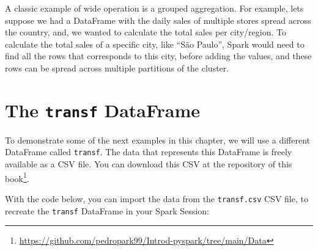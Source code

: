 \documentclass[
  11pt,
  letterpaper,
  DIV=11,
  numbers=noendperiod]{scrreprt}
\begin{document}
A classic example of wide operation is a grouped aggregation. For
example, lets suppose we had a DataFrame with the daily sales of
multiple stores spread across the country, and, we wanted to calculate
the total sales per city/region. To calculate the total sales of a
specific city, like ``São Paulo'', Spark would need to find all the rows
that corresponds to this city, before adding the values, and these rows
can be spread across multiple partitions of the cluster.

\section{\texorpdfstring{The \texttt{transf}
DataFrame}{The transf DataFrame}}\label{sec-transf-dataframe}

To demonstrate some of the next examples in this chapter, we will use a
different DataFrame called \texttt{transf}. The data that represents
this DataFrame is freely available as a CSV file. You can download this
CSV at the repository of this book\footnote{\url{https://github.com/pedropark99/Introd-pyspark/tree/main/Data}}.

With the code below, you can import the data from the
\texttt{transf.csv} CSV file, to recreate the \texttt{transf} DataFrame
in your Spark Session:
\end{document}

